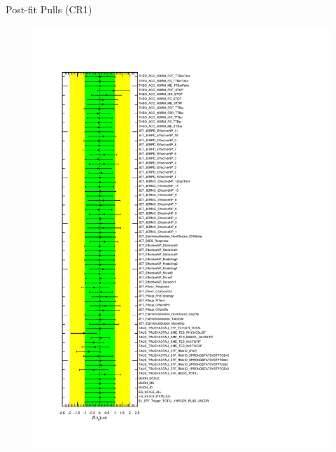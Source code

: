 \documentclass[aspectratio=46, dvipdfmx, 10pt, t]{beamer} %
\begin{document}
\begin{frame}{Post-fit Pulls (CR1)}
  \begin{figure}
    \includegraphics[scale=0.3]{pull_pulls_stLT400}
  \end{figure}
\end{frame}
\end{document}
